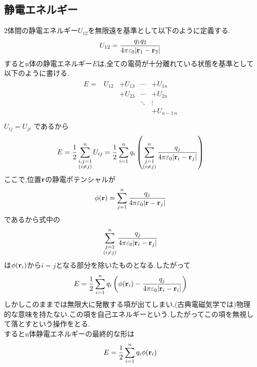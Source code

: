 \documentclass[../main]{subfiles}
\begin{document}
\subsection{静電エネルギー}
2体間の静電エネルギー$U_{12}$を無限遠を基準として以下のように定義する.
\begin{eqnarray*}
U_{12} = \frac{q_1q_2}{4 \pi \varepsilon_0 |{\bf r}_1-{\bf r}_2|}
\end{eqnarray*}
するとn体の静電エネルギー$E$は,全ての電荷が十分離れている状態を基準として以下のように書ける.
\begin{eqnarray*}
\begin{array}{ccccc}
E=& U_{12} & +U_{13} & \cdots & +U_{1n} \\
\ & \ & +U_{23} & \cdots & + U_{2n} \\
\ & \ & \ & \ddots & \vdots \\
\ & \ & \ & \ & + U_{n-1\, n} \\
\end{array}
\end{eqnarray*}
$U_{ij} = U_{ji}$ であるから
\begin{eqnarray*}
E = \frac{1}{2} \sum_{ \substack{i,j = 1 \\ (i \neq j)} }^{n} U_{ij} = \frac{1}{2} \sum_{i = 1}^{n} q_i \left( \sum_{ \substack{j = 1 \\ (i \neq j)} }^{n}
\frac{q_j}{4 \pi \varepsilon_0 |{\bf r}_i-{\bf r}_j|} \right)
\end{eqnarray*}
ここで,位置${\bf r}$の静電ポテンシャルが
\begin{eqnarray*}
\phi({\bf r}) = \sum_{j=1}^{n} \frac{q_j}{4 \pi \varepsilon_0 |{\bf r}-{\bf r}_j|}
\end{eqnarray*}
であるから式中の
\begin{eqnarray*}
\sum_{ \substack{j = 1 \\ (i \neq j)} }^{n}
\frac{q_j}{4 \pi \varepsilon_0 |{\bf r}_i-{\bf r}_j|}
\end{eqnarray*}
は$\phi({\bf r}_i)$から$i=j$となる部分を除いたものとなる.したがって
\begin{eqnarray*}
E = \frac{1}{2} \sum_{i = 1}^{n} q_i \left( \phi({\bf r}_i) - \frac{q_j}{4 \pi \varepsilon_0 |{\bf r}_i-{\bf r}_i|} \right)
\end{eqnarray*}
しかしこのままでは無限大に発散する項が出てしまい,(古典電磁気学では)物理的な意味を持たない.この項を自己エネルギーという.したがってこの項を無視して落とすという操作をとる. \\
するとn体静電エネルギーの最終的な形は
\begin{eqnarray}
E = \frac{1}{2} \sum_{i = 1}^{n} q_i \phi ({\bf r}_i)
\end{eqnarray}
\end{document}
